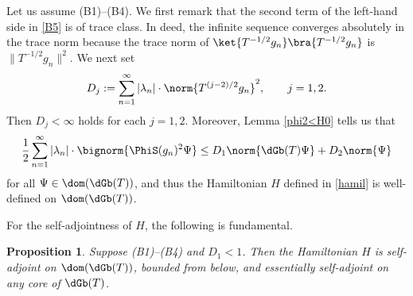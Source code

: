 \documentclass[12pt,draft]{article}
\theoremstyle{plain}
\newtheorem{prop}[theorem]{\bf Proposition}
\numberwithin{equation}{section}
\theoremstyle{remark}
\begin{document}
Let us assume (B1)--(B4).
We first remark that the second term of the left-hand side in \eqref{B5} is of trace class.
In deed, the infinite sequence converges absolutely in the trace norm because the trace norm of $\ket{T^{-1/2}g_n} \bra{T^{-1/2}g_n}$ is $\|T^{-1/2}g_n\|^2$.
We next set
\begin{equation*}
 D_j := \sum_{n=1}^\infty |\lambda_n|\cdot\norm{T^{(j-2)/2}g_n}^2, \qquad j=1,2.
\end{equation*}
Then $D_j<\infty$ holds for each $j=1,2$.
Moreover, Lemma \ref{phi2<H0} tells us that
\begin{equation}\label{aiueo2}
 \frac{1}{2}\sum_{n=1}^\infty|\lambda_n|\cdot\bignorm{\PhiS(g_n)^2\Psi}
 \leq D_1 \norm{\dGb(T)\Psi} + D_2\norm{\Psi}
\end{equation}
for all $\Psi\in\dom(\dGb(T))$, and thus the Hamiltonian $H$ defined in \eqref{hamil} is well-defined on $\dom(\dGb(T))$.

For the self-adjointness of $H$, the following is fundamental.





\begin{comment}
By Lemma \ref{phi2<H0}, $V_N(\dGb(T)+1)^{-1}$ is bounded and 
\begin{align}
  \norm{(V_N-V_{N'})(\dGb(T)+1)^{-1}} 
 &\leq \sum_{n=N'+1}^N \frac{|\lambda_n|}{2}\norm{\PhiS(g_n)^2(\dGb(T)+1)^{-1}} \notag \\
 &\leq \sum_{n=N'+1}^N |\lambda_n| \big( \norm{T^{-1/2}g_n}^2 + \norm{g_n}^2\big)
\end{align}
for $N>N'>0$. The right-hand side converges to zero as $N,N'\to\infty$ by assumption (B3) and (B4).
Hence $\sum_{n=1}^\infty\lambda_n\PhiS(g_n)^2(\dGb(T)+1)^{-1}$ is a bounded operator, and the limit
\begin{align*}
 V  := \lim_{N\to\infty} V_N  = \frac{1}{2} \sum_{n=1}^\infty \lambda_n \PhiS(g_n)^2 
\end{align*}
exists on $\dom(\dGb(T))$.
Thus, by assuming (B1)--(B4), the limit in \eqref{hamil} converges, 
and $H$ is certainly defined on $\dom(\dGb(T))$.
\end{comment}

\begin{prop}{\label{saH1}}
  Suppose (B1)--(B4) and $D_1<1$.
 Then the Hamiltonian $H$ is self-adjoint on $\dom(\dGb(T))$, bounded from below,
and essentially self-adjoint on any core of $\dGb(T)$.
\end{prop}
\end{document}
